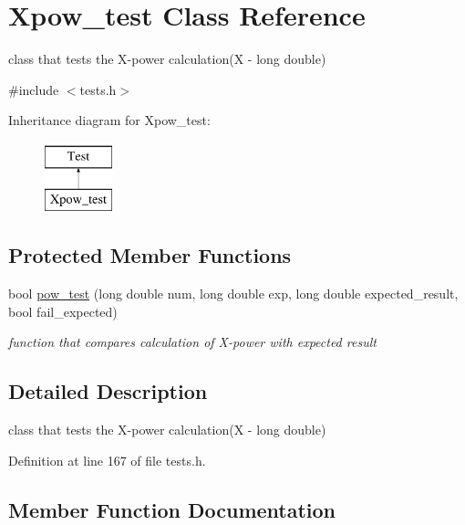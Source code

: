\hypertarget{class_xpow__test}{}\section{Xpow\+\_\+test Class Reference}
\label{class_xpow__test}


class that tests the X-\/power calculation(X -\/ long double)  




{\ttfamily \#include $<$tests.\+h$>$}

Inheritance diagram for Xpow\+\_\+test\+:\begin{figure}[H]
\begin{center}
\leavevmode
\includegraphics[height=2.000000cm]{class_xpow__test}
\end{center}
\end{figure}
\subsection*{Protected Member Functions}
\begin{DoxyCompactItemize}
\item 
bool \mbox{\hyperlink{class_xpow__test_a561006cff5ae01179db6d42fa3e9fc70}{pow\+\_\+test}} (long double num, long double exp, long double expected\+\_\+result, bool fail\+\_\+expected)
\begin{DoxyCompactList}\small\item\em function that compares calculation of X-\/power with expected result \end{DoxyCompactList}\end{DoxyCompactItemize}


\subsection{Detailed Description}
class that tests the X-\/power calculation(X -\/ long double) 

Definition at line 167 of file tests.\+h.



\subsection{Member Function Documentation}
\mbox{\label{class_xpow__test_a561006cff5ae01179db6d42fa3e9fc70}} 
